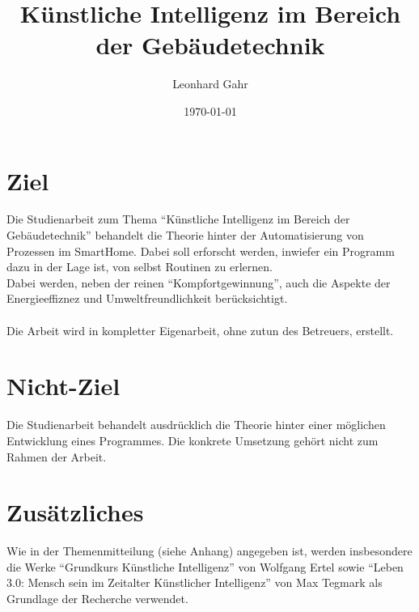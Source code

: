 \documentclass[
	ngerman,
	12pt, %
]{pm}
\title{Künstliche Intelligenz im Bereich der Gebäudetechnik}
\author{Leonhard Gahr} %
\date{\today} %
\institute{\texttt{[image: ../img/sie-logo.png]}\hfill\texttt{[image: ../img/dhbw-logo]}} %
\begin{document}
\maketitle %


\section*{\large Ziel}
Die Studienarbeit zum Thema \enquote{Künstliche Intelligenz im Bereich der Gebäudetechnik} behandelt die Theorie hinter der Automatisierung von Prozessen im SmartHome. Dabei soll erforscht werden, inwiefer ein Programm dazu in der Lage ist, von selbst Routinen zu erlernen.\\
Dabei werden, neben der reinen \enquote{Kompfortgewinnung}, auch die Aspekte der Energieeffiznez und Umweltfreundlichkeit berücksichtigt.\\\\
Die Arbeit wird in kompletter Eigenarbeit, ohne zutun des Betreuers, erstellt.

\section*{\large Nicht-Ziel}
Die Studienarbeit behandelt ausdrücklich die Theorie hinter einer möglichen Entwicklung eines Programmes. Die konkrete Umsetzung gehört nicht zum Rahmen der Arbeit.

\section*{\large Zusätzliches}
Wie in der Themenmitteilung (siehe Anhang) angegeben ist, werden insbesondere die Werke \enquote{Grundkurs Künstliche Intelligenz} von Wolfgang Ertel sowie \enquote{Leben 3.0: Mensch sein im Zeitalter Künstlicher Intelligenz} von Max Tegmark als Grundlage der Recherche verwendet.
\end{document}
